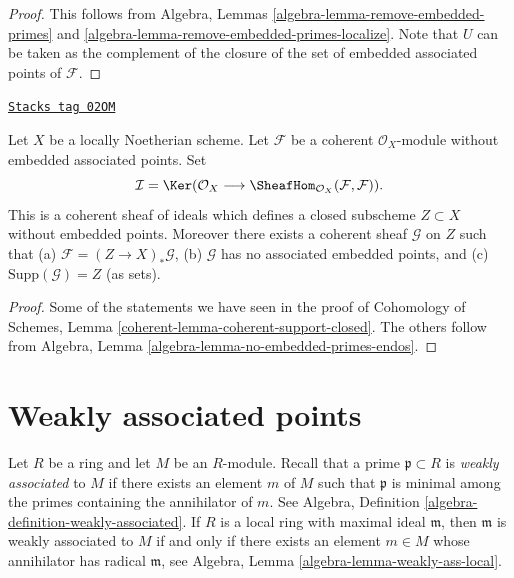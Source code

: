 \begin{proof}
This follows from
Algebra, Lemmas \ref{algebra-lemma-remove-embedded-primes} and
\ref{algebra-lemma-remove-embedded-primes-localize}.
Note that $U$ can be taken as the complement of the closure
of the set of embedded associated points of $\mathcal{F}$.
\end{proof}

\begin{lemma}
\label{divisors-lemma-no-embedded-points-endos}
\href{https://stacks.math.columbia.edu/tag/02OM}{\texttt{Stacks tag 02OM}}

Let $X$ be a locally Noetherian scheme.
Let $\mathcal{F}$ be a coherent $\mathcal{O}_X$-module
without embedded associated points. Set
$$
\mathcal{I}
=
\Ker(\mathcal{O}_X
\longrightarrow
\SheafHom_{\mathcal{O}_X}(\mathcal{F}, \mathcal{F})).
$$
This is a coherent sheaf of ideals which defines a closed
subscheme $Z \subset X$ without embedded points. Moreover
there exists a coherent sheaf $\mathcal{G}$ on $Z$
such that (a) $\mathcal{F} = (Z \to X)_*\mathcal{G}$,
(b) $\mathcal{G}$ has no associated embedded points, and
(c) $\text{Supp}(\mathcal{G}) = Z$ (as sets).
\end{lemma}

\begin{proof}
Some of the statements we have seen in the proof of
Cohomology of Schemes, Lemma \ref{coherent-lemma-coherent-support-closed}.
The others follow from
Algebra, Lemma \ref{algebra-lemma-no-embedded-primes-endos}.
\end{proof}

\section{Weakly associated points}
\label{divisors-section-weakly-associated}
Let $R$ be a ring and let $M$ be an $R$-module.
Recall that a prime $\mathfrak p \subset R$ is {\it weakly associated}
to $M$ if there exists an element $m$ of $M$ such that $\mathfrak p$ is
minimal among the primes containing the annihilator of $m$. See
Algebra, Definition \ref{algebra-definition-weakly-associated}.
If $R$ is a local ring with maximal ideal $\mathfrak m$, then
$\mathfrak m$ is weakly associated to $M$ if and only if there exists an
element $m \in M$ whose annihilator has radical $\mathfrak m$, see
Algebra, Lemma \ref{algebra-lemma-weakly-ass-local}.

